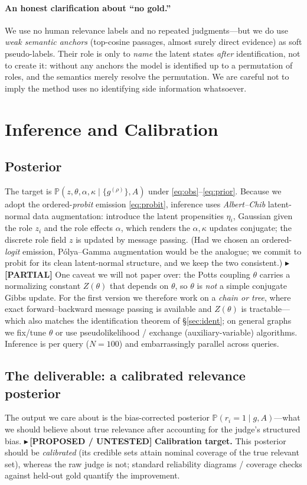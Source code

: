 \documentclass[11pt]{article}
\newcommand{\PARTIAL}[1]{{\color{orange}\small$\blacktriangleright$\,\textbf{[PARTIAL]} #1}}
\newcommand{\PROP}[1]{{\color{violet}\small$\blacktriangleright$\,\textbf{[PROPOSED / UNTESTED]} #1}}
\renewcommand{\Pr}{\mathbb{P}}
\begin{document}
\paragraph{An honest clarification about ``no gold.''} We use no human relevance labels and no repeated
judgments---but we do use \emph{weak semantic anchors} (top-cosine passages, almost surely direct evidence) as
soft pseudo-labels. Their role is only to \emph{name} the latent states \emph{after} identification, not to
create it: without any anchors the model is identified up to a permutation of roles, and the semantics merely
resolve the permutation. We are careful not to imply the method uses no identifying side information whatsoever.

\section{Inference and Calibration}\label{sec:infer}
\subsection{Posterior}
The target is $\Pr(z,\theta,\alpha,\kappa\mid\{g^{(\rho)}\},A)$ under \eqref{eq:obs}--\eqref{eq:prior}. Because
we adopt the ordered-\emph{probit} emission \eqref{eq:probit}, inference uses \emph{Albert--Chib} latent-normal
data augmentation: introduce the latent propensities $\eta_i$, Gaussian given the role $z_i$ and the role
effects $\alpha$, which renders the $\alpha,\kappa$ updates conjugate; the discrete role field $z$ is updated by
message passing. (Had we chosen an ordered-\emph{logit} emission, Pólya--Gamma augmentation would be the
analogue; we commit to probit for its clean latent-normal structure, and we keep the two consistent.)
\PARTIAL{One caveat we will not paper over: the Potts coupling $\theta$ carries a normalizing constant
$Z(\theta)$ that depends on $\theta$, so $\theta$ is \emph{not} a simple conjugate Gibbs update. For the first
version we therefore work on a \emph{chain or tree}, where exact forward--backward message passing is available
and $Z(\theta)$ is tractable---which also matches the identification theorem of \S\ref{sec:ident}; on general
graphs we fix/tune $\theta$ or use pseudolikelihood / exchange (auxiliary-variable) algorithms. Inference is per
query ($N{=}100$) and embarrassingly parallel across queries.}

\subsection{The deliverable: a calibrated relevance posterior}
The output we care about is the bias-corrected posterior $\Pr(r_i{=}1\mid g,A)$---what we should believe about
true relevance after accounting for the judge's structured bias.
\PROP{\textbf{Calibration target.} This posterior should be \emph{calibrated} (its credible sets attain nominal
coverage of the true relevant set), whereas the raw judge is not; standard reliability diagrams / coverage
checks against held-out gold quantify the improvement.}
\end{document}
